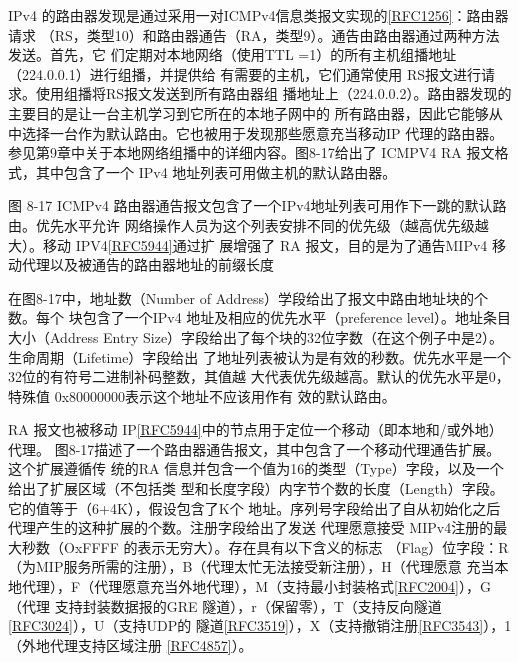 IPv4 的路由器发现是通过采用一对ICMPv4信息类报文实现的\href{https://www.rfc-editor.org/rfc/rfc1256}{[RFC1256]}：路由器请求
（RS，类型10）和路由器通告（RA，类型9）。通告由路由器通过两种方法发送。首先，它
们定期对本地网络（使用TTL =1）的所有主机组播地址（224.0.0.1）进行组播，并提供给
有需要的主机，它们通常使用 RS报文进行请求。使用组播将RS报文发送到所有路由器组
播地址上（224.0.0.2）。路由器发现的主要目的是让一台主机学习到它所在的本地子网中的
所有路由器，因此它能够从中选择一台作为默认路由。它也被用于发现那些愿意充当移动IP
代理的路由器。参见第9章中关于本地网络组播中的详细内容。图8-17给出了 ICMPV4 RA
报文格式，其中包含了一个 IPv4 地址列表可用做主机的默认路由器。

图 8-17 ICMPv4 路由器通告报文包含了一个IPv4地址列表可用作下一跳的默认路由。优先水平允许
网络操作人员为这个列表安排不同的优先级（越高优先级越大）。移动 IPV4\href{https://www.rfc-editor.org/rfc/rfc5944}{[RFC5944]}通过扩
展增强了 RA 报文，目的是为了通告MIPv4 移动代理以及被通告的路由器地址的前缀长度

在图8-17中，地址数（Number of Address）学段给出了报文中路由地址块的个数。每个
块包含了一个IPv4 地址及相应的优先水平（preference level）。地址条目大小（Address Entry
Size）字段给出了每个块的32位字数（在这个例子中是2）。生命周期（Lifetime）字段给出
了地址列表被认为是有效的秒数。优先水平是一个32位的有符号二进制补码整数，其值越
大代表优先级越高。默认的优先水平是0，特殊值 0x80000000表示这个地址不应该用作有
效的默认路由。

RA 报文也被移动 IP\href{https://www.rfc-editor.org/rfc/rfc5944}{[RFC5944]}中的节点用于定位一个移动（即本地和/或外地）代理。
图8-17描述了一个路由器通告报文，其中包含了一个移动代理通告扩展。这个扩展遵循传
统的RA 信息并包含一个值为16的类型（Type）字段，以及一个给出了扩展区域（不包括类
型和长度字段）内字节个数的长度（Length）字段。它的值等于（6+4K），假设包含了K个
地址。序列号字段给出了自从初始化之后代理产生的这种扩展的个数。注册字段给出了发送
代理愿意接受 MIPv4注册的最大秒数（OxFFFF 的表示无穷大）。存在具有以下含义的标志
（Flag）位字段：R（为MIP服务所需的注册），B（代理太忙无法接受新注册），H（代理愿意
充当本地代理），F（代理愿意充当外地代理），M（支持最小封装格式\href{https://www.rfc-editor.org/rfc/rfc2004}{[RFC2004]}），G（代理
支持封装数据报的GRE 隧道），r（保留零），T（支持反向隧道\href{https://www.rfc-editor.org/rfc/rfc3024}{[RFC3024]}），U（支持UDP的
隧道\href{https://www.rfc-editor.org/rfc/rfc3519}{[RFC3519]}），X（支持撤销注册\href{https://www.rfc-editor.org/rfc/rfc3543}{[RFC3543]}），1（外地代理支持区域注册 \href{https://www.rfc-editor.org/rfc/rfc4857}{[RFC4857]}）。

